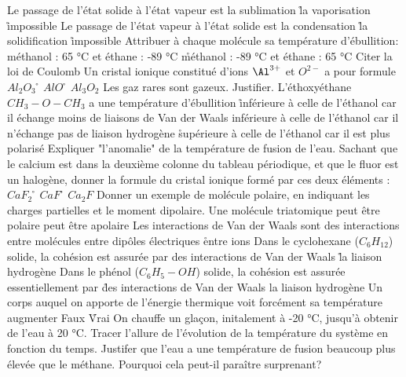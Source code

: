\q
Le passage de l'état solide à l'état vapeur est
\rv
la sublimation
\r
la vaporisation
\r
impossible
\q
Le passage de l'état vapeur à l'état solide est
\rv
la condensation
\r
la solidification
\r
impossible
\q
Attribuer à chaque molécule sa température d'ébullition:
\rv
méthanol : 65 °C et éthane : -89 °C
\r
méthanol : -89 °C et éthane : 65 °C  
\q 
Citer la loi de Coulomb
\q
Un cristal ionique constitué d'ions $\Al^{3+}$ et $O^{2-}$ a pour formule
\rv
$Al_2O_3$
\r
$AlO$
\r
$Al_3O_2$
\q
Les gaz rares sont gazeux. Justifier.
\q
L'éthoxyéthane $CH_3-O-CH_3$ a une température d'ébullition
\r
inférieure à celle de l'éthanol car il échange moins de liaisons de Van der Waals
\rv
inférieure à celle de l'éthanol car il n'échange pas de liaison hydrogène
\r
supérieure à celle de l'éthanol car il est plus polarisé
\q
Expliquer "l'anomalie" de la température de fusion de l'eau.
\q
Sachant que le calcium est dans la deuxième colonne du tableau périodique, et que le fluor est un halogène, donner la formule du cristal ionique formé par ces deux éléments :
\rv
$CaF_2$
\r
$CaF$
\r
$Ca_2F$
\q
Donner un exemple de molécule polaire, en indiquant les charges partielles et le moment dipolaire.
\q
Une molécule triatomique 
\rv
peut être polaire
\rv
peut être apolaire
\q
Les interactions de Van der Waals sont des interactions
\rv
entre molécules
\rv
entre dipôles électriques
\r
entre ions
\q
Dans le cyclohexane ($C_6H_{12}$) solide, la cohésion est assurée par
\rv
des interactions de Van der Waals
\r
la liaison hydrogène
\q
Dans le phénol ($C_6H_5-OH$) solide, la cohésion est assurée essentiellement par
\r
des interactions de Van der Waals
\rv
la liaison hydrogène
\q
Un corps auquel on apporte de l'énergie thermique
voit forcément sa température augmenter
\rv
Faux
\r
Vrai
\q
On chauffe un glaçon, initalement à -20 °C, jusqu'à obtenir de l'eau à 20 °C. Tracer l'allure de l'évolution de la température du système en fonction du temps.
\q
Justifer que l'eau a une température de fusion beaucoup plus élevée que le méthane. Pourquoi cela peut-il paraître surprenant?




